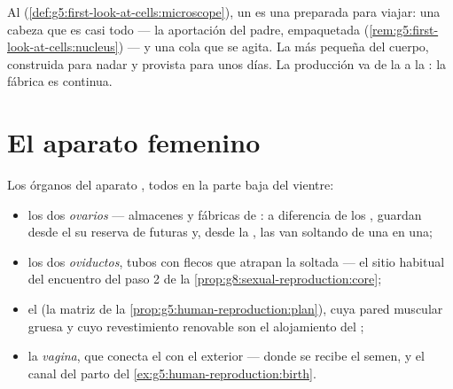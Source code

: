 \begin{example}\label{ex:g8:reproductive-systems:sperm}
Al  (\cref{def:g5:first-look-at-cells:microscope}), un
 es una  preparada para viajar: una cabeza que es
casi todo  --- la aportación del padre, empaquetada
(\cref{rem:g5:first-look-at-cells:nucleus}) --- y una cola que se
agita. La  más pequeña del cuerpo, construida para nadar y
provista para unos días. La producción va de la  a la : la
fábrica  es continua.
\end{example}

\section{El aparato femenino}

\begin{definition}\label{def:g8:reproductive-systems:female}
Los órganos del aparato , todos en la parte baja del vientre:
\begin{itemize}
  \item los dos \emph{ovarios} --- almacenes y fábricas
        de : a diferencia de los , guardan desde el
         su reserva de futuras \emph{ } y,
        desde la , las van soltando de una en una;
  \item los dos \emph{oviductos}, tubos con flecos que
        atrapan la  soltada --- el sitio habitual del encuentro
        del paso 2 de la \cref{prop:g8:sexual-reproduction:core};
  \item el \emph{} (la matriz de la
        \cref{prop:g5:human-reproduction:plan}), cuya pared muscular
        gruesa y cuyo revestimiento renovable son el alojamiento del
        ;
  \item la \emph{vagina}, que conecta el  con el exterior ---
        donde se recibe el semen, y el canal del parto del
        \cref{ex:g5:human-reproduction:birth}.
\end{itemize}
\end{definition}

